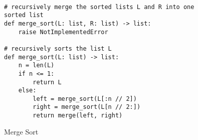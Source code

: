 \begin{definition}
    ~

\begin{center}
\begin{minipage}{.5\linewidth}
\begin{figure}[H]
\renewcommand\figurename{Algorithm}
\begin{verbatim}
# recursively merge the sorted lists L and R into one sorted list
def merge_sort(L: list, R: list) -> list:
    raise NotImplementedError

# recursively sorts the list L
def merge_sort(L: list) -> list:
    n = len(L)
    if n <= 1:
        return L
    else:
        left = merge_sort(L[:n // 2])
        right = merge_sort(L[n // 2:])
        return merge(left, right)
\end{verbatim}
\caption{Merge Sort}\label{alg:mergesort}
\end{figure}
\end{minipage}
\end{center}

\end{definition}

